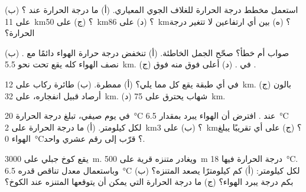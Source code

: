 \begin{exercise}[$\star$]\label{exo:g8:the-atmosphere:2}
استعمل مخطط درجة الحرارة للغلاف الجوي المعياري. (أ) ما درجة الحرارة عند
؟ (ب) على  \qty{11}{km}؟ (ج) على 
\qty{50}{km}؟ (د) على  \qty{86}{km}؟ (ه) بين أي ارتفاعين لا تتغير
درجة الحرارة؟
\end{exercise}

\begin{exercise}[$\star$]\label{exo:g8:the-atmosphere:3}
صواب أم خطأ؟ صحّح الجمل الخاطئة. (أ) تنخفض درجة حرارة الهواء دائمًا مع
. (ب) نصف الهواء كله يقع تحت نحو \qty{5.5}{km}. (ج) 
في . (د)  أعلى فوق  منه فوق .
\end{exercise}

\begin{exercise}[$\star$]\label{exo:g8:the-atmosphere:4}
في أي طبقة يقع كل مما يلي؟ (أ)  ممطرة. (ب) طائرة ركاب على 
\qty{12}{km}. (ج) بالون أرصاد قبيل انفجاره، على  \qty{32}{km}. (د)
شهاب يحترق على  \qty{75}{km}.
\end{exercise}

\begin{exercise}[$\star\star$]\label{exo:g8:the-atmosphere:5}
في يوم صيفي، تبلغ درجة الحرارة \qty{20}{\degreeCelsius} عند . افترض أن الهواء يبرد بمقدار \qty{6.5}{\degreeCelsius} لكل كيلومتر.
(أ) ما درجة الحرارة على  \qty{2}{km}؟ (ب) على  \qty{3}{km}؟
(ج) على أي  تقريبًا يبلغ الهواء \qty{0}{\degreeCelsius}؟ قرّب إلى رقم
عشري واحد.
\end{exercise}

\begin{exercise}[$\star\star$]\label{exo:g8:the-atmosphere:6}
يقع كوخ جبلي على  \qty{3000}{m}. ويغادر متنزه قرية على 
\qty{500}{m} درجة الحرارة فيها \qty{18}{\degreeCelsius}. وباستعمال معدل
تناقص قدره \qty{6.5}{\degreeCelsius} لكل كيلومتر: (أ) كم كيلومترًا يصعد
المتنزه؟ (ب) بكم درجة يبرد الهواء؟ (ج) ما درجة الحرارة التي يمكن أن يتوقعها
المتنزه عند الكوخ؟
\end{exercise}

